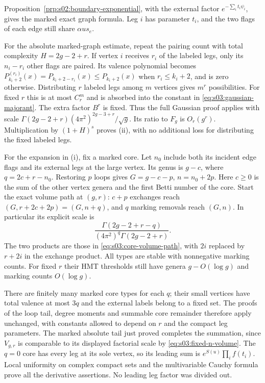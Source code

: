 \begin{prf}
Proposition~\ref{prp:s02:boundary-exponential}, with the external
factor $e^{-\sum_i t_i\psi_i}$, gives the marked exact graph
formula. Leg $i$ has parameter $t_i$, and the two flags of each
edge still share $\alpha u s_e$.

For the absolute marked-graph estimate, repeat the pairing count
with total complexity $H=2g-2+r$. If vertex $i$ receives $r_i$
of the labeled legs, only its $n_i-r_i$ other flags are paired.
Its valence polynomial becomes
$P_{k_i+2}^{(r_i)}(x)=P_{k_i+2-r_i}(x)\leq P_{k_i+2}(x)$
when $r_i\leq k_i+2$, and is zero otherwise. Distributing $r$
labeled legs among $m$ vertices gives $m^r$ possibilities.
For fixed $r$ this is at most $C_r^m$ and is absorbed into the
constant in \eqref{eq:s03:gaussian-majorant}. The extra factor
$B^r$ is fixed. Thus the full Gaussian proof applies with scale
$\Gamma(2g-2+r)(4\pi^2)^{2g-3+r}/\sqrt g$.
Its ratio to $F_g$ is $O_r(g^r)$. Multiplication by $(1+H)^s$
proves \textup{(ii)}, with no additional loss for distributing
the fixed labeled legs.

For the expansion in \textup{(i)}, fix a marked core. Let $n_0$
include both its incident edge flags and its external legs at the
large vertex. Its genus is $g-c$, where
$q=2c+r-n_0$. Restoring $p$ loops gives
$G=g-c-p$, $n=n_0+2p$. Here $c\geq0$ is the sum of the other
vertex genera and the first Betti number of the core.
Start the exact volume path at $(g,r)$: $c+p$ exchanges reach
$(G,r+2c+2p)=(G,n+q)$, and $q$ marking removals reach $(G,n)$.
In particular its explicit scale is
\begin{equation}
\label{eq:s03:marked-volume-scale}
\frac{\Gamma(2g-2+r-q)}
     {(4\pi^2)^q\Gamma(2g-2+r)}.
\end{equation}
The two products are those in \eqref{eq:s03:core-volume-path},
with $2i$ replaced by $r+2i$ in the exchange product.
All types are stable with nonnegative marking counts. For fixed
$r$ their HMT thresholds still have genera $g-O(\log g)$ and
marking counts $O(\log g)$.

There are finitely many marked core types for each $q$; their
small vertices have total valence at most $3q$ and the external
labels belong to a fixed set. The proofs of the loop tail, degree
moments and summable core remainder therefore apply unchanged,
with constants allowed to depend on $r$ and the compact leg
parameters. The marked absolute tail just proved completes the
summation, since $V_{g,r}$ is comparable to its displayed factorial
scale by \eqref{eq:s03:fixed-n-volume}. The $q=0$ core
has every leg at its sole vertex, so its leading sum is
$e^{S(u)}\prod_i f(t_i)$. Local uniformity on complex compact sets
and the multivariable Cauchy formula prove all the derivative
assertions. No leading leg factor was divided out.
\end{prf}

